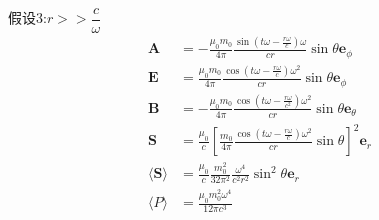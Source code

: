 假设3:$r>>\dfrac{c}{\omega}$
\begin{align}
    \boldsymbol{A}&=-\frac{\mu_0m_0}{4\pi}\frac{
    \sin\left(t\omega-\frac{r\omega}{c}\right)\omega }{cr}\sin\theta\boldsymbol{e}_\phi\\
    \boldsymbol{E}&=\frac{\mu_0m_0}{4\pi}\frac{
    \cos\left(t\omega-\frac{r\omega}{c}\right)\omega^2 }{cr}\sin\theta\boldsymbol{e}_\phi\\
    \boldsymbol{B}&=-\frac{\mu_0m_0}{4\pi}\frac{
    \cos\left(t\omega-\frac{r\omega}{c^2}\right)\omega^2 }{cr}\sin\theta\boldsymbol{e}_\theta\\
    \boldsymbol{S}&=\frac{\mu_0}{c}\left[\frac{m_0}{4\pi}\frac{
    \cos\left(t\omega-\frac{r\omega}{c}\right)\omega^2 }{cr}\sin\theta\right]^2\boldsymbol{e}_r\\
    \langle\boldsymbol{S} \rangle&=\frac{\mu_0}{c}\frac{m_0^2}{32\pi^2}\frac{\omega^4 }{c^2r^2}\sin^2\theta\boldsymbol{e}_r\\
    \langle P\rangle&=\frac{\mu_0m_0^2\omega^4}{12\pi c^3}
\end{align}

